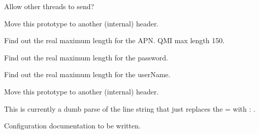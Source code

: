 \begin{DoxyRefList}
\item[\label{todo__todo000049}%
\hypertarget{todo__todo000049}{}%
Global \hyperlink{messaging_session_8h_a437772a607fe574d55c4b86e71ffae6d}{msg\+Session\+\_\+\+Send\+Message} (le\+\_\+msg\+\_\+\+Session\+Ref\+\_\+t session\+Ref, le\+\_\+msg\+\_\+\+Message\+Ref\+\_\+t message\+Ref)]Allow other threads to send?  
\item[\label{todo__todo000067}%
\hypertarget{todo__todo000067}{}%
Global \hyperlink{pa__antenna_8h_a9469be488d235273077bd18e8fc8697d}{pa\+\_\+antenna\+\_\+\+Init} (void)]Move this prototype to another (internal) header.  
\item[\label{todo__todo000068}%
\hypertarget{todo__todo000068}{}%
Global \hyperlink{pa__mdc_8h_acd55db6349f5835c76681394bd12b6cb}{P\+A\+\_\+\+M\+D\+C\+\_\+\+A\+P\+N\+\_\+\+M\+A\+X\+\_\+\+L\+EN} ]Find out the real maximum length for the A\+PN. Q\+MI max length 150.  
\item[\label{todo__todo000070}%
\hypertarget{todo__todo000070}{}%
Global \hyperlink{pa__mdc_8h_af7904e71e6cbe017c20005f883ccc7ce}{P\+A\+\_\+\+M\+D\+C\+\_\+\+P\+W\+D\+\_\+\+M\+A\+X\+\_\+\+L\+EN} ]Find out the real maximum length for the password.  
\item[\label{todo__todo000069}%
\hypertarget{todo__todo000069}{}%
Global \hyperlink{pa__mdc_8h_afadf86ca8c58e243e2c9838e116492b3}{P\+A\+\_\+\+M\+D\+C\+\_\+\+U\+S\+E\+R\+N\+A\+M\+E\+\_\+\+M\+A\+X\+\_\+\+L\+EN} ]Find out the real maximum length for the user\+Name.  
\item[\label{todo__todo000071}%
\hypertarget{todo__todo000071}{}%
Global \hyperlink{pa__ri_pin_8h_a5dcc3852fa09b774ba381ee135a1aba5}{pa\+\_\+ri\+Pin\+\_\+\+Init} (void)]Move this prototype to another (internal) header.  
\item[\label{todo__todo000057}%
\hypertarget{todo__todo000057}{}%
Global \hyperlink{app_ctrl_8c_a4d3847d48afd818ad393f1070d7a1a16}{Parsed\+Info\+Line} (const char $\ast$line\+Ptr)]This is currently a dumb parse of the line string that just replaces the \textquotesingle{}=\textquotesingle{} with \textquotesingle{}\+: \textquotesingle{}. 
\item[\label{todo__todo000064}%
\hypertarget{todo__todo000064}{}%
Page \hyperlink{c_port}{Port Service} ]Configuration documentation to be written.


\end{DoxyRefList}
